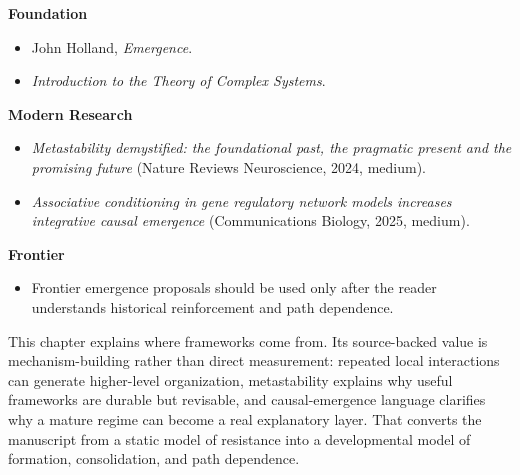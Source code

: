 \begin{readingbox}
\textbf{Foundation}
\begin{itemize}[nosep]
  \item John Holland, \emph{Emergence}.
  \item \emph{Introduction to the Theory of Complex Systems}.
\end{itemize}
\textbf{Modern Research}
\begin{itemize}[nosep]
  \item \emph{Metastability demystified: the foundational past, the pragmatic
        present and the promising future} (Nature Reviews Neuroscience, 2024,
        medium).
  \item \emph{Associative conditioning in gene regulatory network models
        increases integrative causal emergence} (Communications Biology, 2025,
        medium).
\end{itemize}
\textbf{Frontier}
\begin{itemize}[nosep]
  \item Frontier emergence proposals should be used only after the reader
        understands historical reinforcement and path dependence.
\end{itemize}
\end{readingbox}

\begin{summarybox}
This chapter explains where frameworks come from. Its source-backed value is
mechanism-building rather than direct measurement: repeated local interactions
can generate higher-level organization, metastability explains why useful
frameworks are durable but revisable, and causal-emergence language clarifies
why a mature regime can become a real explanatory layer. That converts the
manuscript from a static model of resistance into a developmental model of
formation, consolidation, and path dependence.
\end{summarybox}
